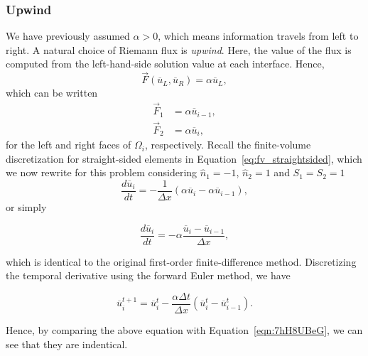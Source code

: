 \subsubsection{Upwind}
We have previously assumed $\alpha>0$, which means information travels from left to right. A natural choice of Riemann flux is \textit{upwind}. Here, the value of the flux is computed from the left-hand-side solution value at each interface. Hence, 
\begin{equation}
 \vec F(\overline u_L, \overline u_R) = \alpha \overline u_L, 
\end{equation}
which can be written 
\begin{align}
 \vec F_1 &= \alpha \overline u_{i-1}, \\ 
 \vec F_2 &= \alpha \overline u_{i},
\end{align}
for the left and right faces of $\Omega_i$, respectively. Recall the finite-volume discretization for straight-sided elements in Equation~\ref{eq:fv_straightsided}, which we now rewrite for this problem considering $\hat n_1=-1$, $\hat n_2=1$ and $S_1=S_2=1$
\begin{equation}
 \frac{d \overline{u}_i}{dt} = -\frac{1}{\Delta x} \left(\alpha \overline {u}_i - \alpha \overline u_{i-1}\right),
\end{equation}
or simply
\begin{eqBox}
\begin{equation}
 \frac{d \overline{u}_i}{dt} = -\alpha \frac{ \overline {u}_i - \overline u_{i-1}}{\Delta x},
\end{equation}
\end{eqBox}
which is identical to the original first-order finite-difference method. Discretizing the temporal derivative using the forward Euler method, we have
\begin{eqBox}
\begin{equation}
\overline u_i^{t+1} = \overline u_i^t - \frac{\alpha \Delta t}{\Delta x} \left( \overline {u}_i^t - \overline u_{i-1}^t\right).
\end{equation}
\end{eqBox}
Hence, by comparing the above equation with Equation~\ref{eqn:7hH8UBeG}, we can see that they are indentical.
